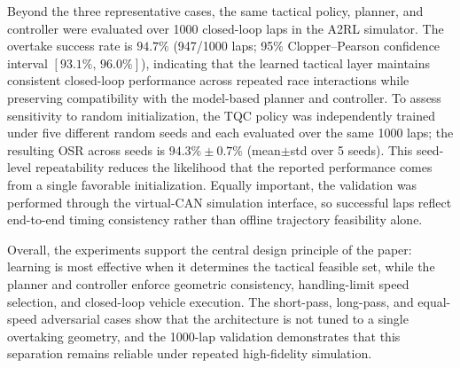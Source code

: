 Beyond the three representative cases, the same tactical policy,
planner, and controller were evaluated over 1000 closed-loop laps in the
A2RL simulator.  The overtake success rate
is $94.7\%$ (947/1000 laps; 95\% Clopper--Pearson confidence interval
$[93.1\%,\,96.0\%]$), indicating that the learned tactical layer maintains
consistent closed-loop performance across repeated race interactions while
preserving compatibility with the model-based planner and controller.
To assess sensitivity to random initialization, the TQC policy was
independently trained under five different random seeds and each
evaluated over the same 1000 laps; the resulting
OSR across seeds is $94.3\%\pm 0.7\%$ (mean$\pm$std over 5 seeds).  This
seed-level repeatability reduces the likelihood that the reported performance
comes from a single favorable initialization.
Equally important, the validation was performed through the virtual-CAN
simulation interface, so successful laps reflect end-to-end timing
consistency rather than offline trajectory feasibility alone.

Overall, the experiments support the central design principle of the paper:
learning is most effective when it determines the tactical feasible set, while
the planner and controller enforce geometric consistency, handling-limit speed
selection, and closed-loop vehicle execution.  The short-pass, long-pass, and
equal-speed adversarial cases show that the architecture is not tuned to a
single overtaking geometry, and the 1000-lap validation demonstrates that this
separation remains reliable under repeated high-fidelity simulation.


